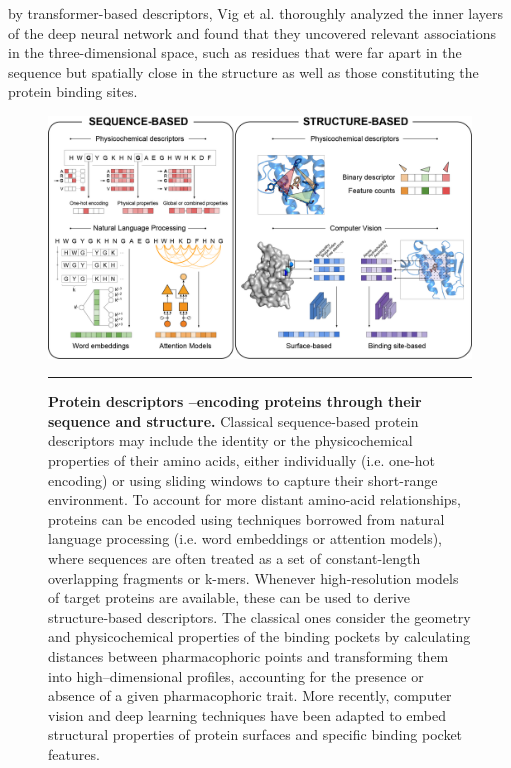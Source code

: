 by transformer-based descriptors, Vig et al. \cite{vig_bertology_2020} thoroughly analyzed the inner layers of the deep neural network and found that they uncovered relevant associations in the three-dimensional space, such as residues that were far apart in the sequence but spatially close in the structure as well as those constituting the protein binding sites. 


\begin{figure}[t!]
  \centering
  \includegraphics[width=\linewidth]{figures/Introduction/figure2_COCB.png}
  \caption{
    \textbf{Protein descriptors --encoding proteins through their sequence and structure.} 
     Classical sequence-based protein descriptors may include the identity or the physicochemical properties of their amino acids, either individually (i.e. one-hot encoding) or using sliding windows to capture their short-range environment. To account for more distant amino-acid relationships, proteins can be encoded using techniques borrowed from natural language processing (i.e. word embeddings or attention models), where sequences are often treated as a set of constant-length overlapping fragments or k-mers. Whenever high-resolution models of target proteins are available, these can be used to derive structure-based descriptors. The classical ones consider the geometry and physicochemical properties of the binding pockets by calculating distances between pharmacophoric points and transforming them into high–dimensional profiles, accounting for the presence or absence of a given pharmacophoric trait. More recently, computer vision and deep learning techniques have been adapted to embed structural properties of protein surfaces and specific binding pocket features.
  }
  \rule[0ex]{\textwidth}{0.5pt}
  \vspace{-5mm}
  \label{Introduction_Fig3}
\end{figure}


